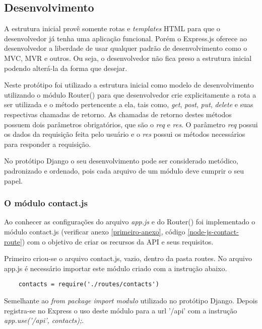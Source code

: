 \subsection{Desenvolvimento}
  
  A estrutura inicial provê somente rotas e \textit{templates} HTML para que o desenvolvedor já tenha uma aplicação funcional.
  Porém o Express.js oferece ao desenvolvedor a liberdade de usar qualquer padrão de desenvolvimento como o MVC, MVR e 
  outros. Ou seja, o desenvolvedor não fica preso a estrutura inicial podendo alterá-la da forma que desejar. 
  
  Neste protótipo foi utilizado a estrutura inicial como modelo de desenvolvimento utilizando o módulo Router() para que desenvolvedor
  crie explicitamente a rota a ser utilizada e o método pertencente a ela, tais como, \textit{get}, \textit{post}, \textit{put}, \textit{delete} e suas respectivas
  chamadas de retorno. As chamadas de retorno destes métodos possuem dois parâmetros obrigatórios, que são o \textit{req} e \textit{res}. O parâmetro
  \textit{req} possui os dados da requisição feita pelo usuário e o \textit{res} possui os métodos necessários para responder a requisição.
  
  No protótipo Django o seu desenvolvimento pode ser considerado metódico, padronizado e ordenado, pois cada arquivo de um módulo
  deve cumprir o seu papel.

\subsubsection{O módulo contact.js }

  Ao conhecer as configurações do arquivo \textit{app.js} e do Router() foi implementado o módulo contact.js (verificar anexo \ref{primeiro-anexo}, código \ref{node-js-contact-route}) com o objetivo
  de criar os recursos da API e seus requisitos.
  
  Primeiro criou-se o arquivo contact.js, vazio, dentro da pasta routes. No arquivo app.js é necessário importar este módulo criado com a
  instrução abaixo.
  
  \begin{verbatim}
    contacts = require('./routes/contacts')
  \end{verbatim}
  
  Semelhante ao \textit{from package import modulo} utilizado no protótipo Django. Depois 
  registra-se no Express o uso deste módulo para a url '/api' com a instrução \textit{app.use('/api', contacts);}.
  
